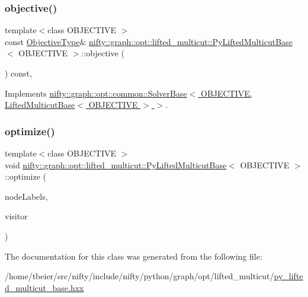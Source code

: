 \subsubsection{\texorpdfstring{objective()}{objective()}}
{\footnotesize\ttfamily template$<$class O\+B\+J\+E\+C\+T\+I\+VE $>$ \\
const \hyperlink{classnifty_1_1graph_1_1opt_1_1lifted__multicut_1_1PyLiftedMulticutBase_a2e2f37a21bb3b5e986e130287bcdeede}{Objective\+Type}\& \hyperlink{classnifty_1_1graph_1_1opt_1_1lifted__multicut_1_1PyLiftedMulticutBase}{nifty\+::graph\+::opt\+::lifted\+\_\+multicut\+::\+Py\+Lifted\+Multicut\+Base}$<$ O\+B\+J\+E\+C\+T\+I\+VE $>$\+::objective (\begin{DoxyParamCaption}{ }\end{DoxyParamCaption}) const\hspace{0.3cm}{\ttfamily [inline]}, {\ttfamily [virtual]}}



Implements \hyperlink{classnifty_1_1graph_1_1opt_1_1common_1_1SolverBase_a55e9eb645c07d6e0782ebfb990ab3c84}{nifty\+::graph\+::opt\+::common\+::\+Solver\+Base$<$ O\+B\+J\+E\+C\+T\+I\+V\+E, Lifted\+Multicut\+Base$<$ O\+B\+J\+E\+C\+T\+I\+V\+E $>$ $>$}.

\mbox{\label{classnifty_1_1graph_1_1opt_1_1lifted__multicut_1_1PyLiftedMulticutBase_af964f40577302eda71f68ba080d4e0f0}} 
\subsubsection{\texorpdfstring{optimize()}{optimize()}}
{\footnotesize\ttfamily template$<$class O\+B\+J\+E\+C\+T\+I\+VE $>$ \\
void \hyperlink{classnifty_1_1graph_1_1opt_1_1lifted__multicut_1_1PyLiftedMulticutBase}{nifty\+::graph\+::opt\+::lifted\+\_\+multicut\+::\+Py\+Lifted\+Multicut\+Base}$<$ O\+B\+J\+E\+C\+T\+I\+VE $>$\+::optimize (\begin{DoxyParamCaption}\item[{\hyperlink{classnifty_1_1graph_1_1opt_1_1lifted__multicut_1_1PyLiftedMulticutBase_afeaa6139205af7449872174c68de2b57}{Node\+Labels\+Type} \&}]{node\+Labels,  }\item[{\hyperlink{classnifty_1_1graph_1_1opt_1_1lifted__multicut_1_1PyLiftedMulticutBase_ac5e5eff52536f20200ad9004bea80998}{Visitor\+Base\+Type} $\ast$}]{visitor }\end{DoxyParamCaption})\hspace{0.3cm}{\ttfamily [inline]}}



The documentation for this class was generated from the following file\+:\begin{DoxyCompactItemize}
\item 
/home/tbeier/src/nifty/include/nifty/python/graph/opt/lifted\+\_\+multicut/\hyperlink{py__lifted__multicut__base_8hxx}{py\+\_\+lifted\+\_\+multicut\+\_\+base.\+hxx}\end{DoxyCompactItemize}
